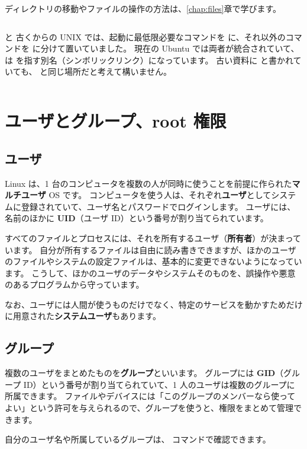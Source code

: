 ディレクトリの移動やファイルの操作の方法は、\ref{chap:files}章で学びます。

\begin{column}{ と }
  古くからの UNIX では、起動に最低限必要なコマンドを  に、それ以外のコマンドを  に分けて置いていました。
  現在の Ubuntu では両者が統合されていて、 は  を指す別名（シンボリックリンク）になっています。
  古い資料に  と書かれていても、 と同じ場所だと考えて構いません。
\end{column}

\section{ユーザとグループ、root 権限}
\label{sec:linux-internals-users}

\subsection{ユーザ}

Linux は、1 台のコンピュータを複数の人が同時に使うことを前提に作られた\textbf{マルチユーザ} OS です。
コンピュータを使う人は、それぞれ\textbf{ユーザ}としてシステムに登録されていて、ユーザ名とパスワードでログインします。
ユーザには、名前のほかに \textbf{UID}（ユーザ ID）という番号が割り当てられています。

すべてのファイルとプロセスには、それを所有するユーザ（\textbf{所有者}）が決まっています。
自分が所有するファイルは自由に読み書きできますが、ほかのユーザのファイルやシステムの設定ファイルは、基本的に変更できないようになっています。
こうして、ほかのユーザのデータやシステムそのものを、誤操作や悪意のあるプログラムから守っています。

なお、ユーザには人間が使うものだけでなく、特定のサービスを動かすためだけに用意された\textbf{システムユーザ}もあります。

\subsection{グループ}

複数のユーザをまとめたものを\textbf{グループ}といいます。
グループには \textbf{GID}（グループ ID）という番号が割り当てられていて、1 人のユーザは複数のグループに所属できます。
ファイルやデバイスには「このグループのメンバーなら使ってよい」という許可を与えられるので、グループを使うと、権限をまとめて管理できます。

自分のユーザ名や所属しているグループは、 コマンドで確認できます。

